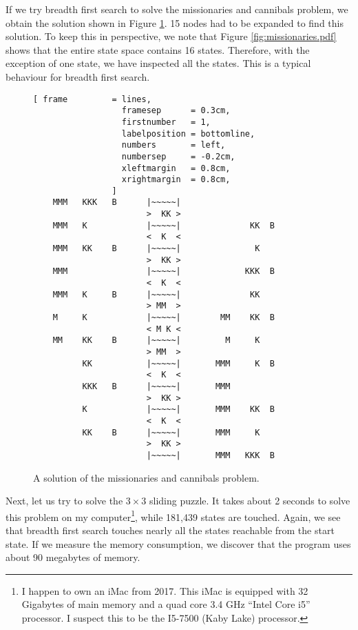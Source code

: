 If we try breadth first search to solve the missionaries and cannibals problem, we obtain
the solution shown in Figure \ref{fig:missionaries.solution}.  15 nodes had to be expanded to find
this solution.  To keep this in perspective, we note that Figure \ref{fig:missionaries.pdf} shows
that the entire state space contains 16 states.  Therefore, with the exception of one state, we have
inspected all the states.  This is a typical behaviour for breadth first search.

\begin{figure}[!ht]
\centering
\begin{Verbatim}[ frame         = lines,
                  framesep      = 0.3cm,
                  firstnumber   = 1,
                  labelposition = bottomline,
                  numbers       = left,
                  numbersep     = -0.2cm,
                  xleftmargin   = 0.8cm,
                  xrightmargin  = 0.8cm,
                ]
    MMM   KKK   B      |~~~~~|
                       >  KK >
    MMM   K            |~~~~~|              KK  B
                       <  K  <
    MMM   KK    B      |~~~~~|               K
                       >  KK >
    MMM                |~~~~~|             KKK  B
                       <  K  <
    MMM   K     B      |~~~~~|              KK
                       > MM  >
    M     K            |~~~~~|        MM    KK  B
                       < M K <
    MM    KK    B      |~~~~~|         M     K
                       > MM  >
          KK           |~~~~~|       MMM     K  B
                       <  K  <
          KKK   B      |~~~~~|       MMM
                       >  KK >
          K            |~~~~~|       MMM    KK  B
                       <  K  <
          KK    B      |~~~~~|       MMM     K
                       >  KK >
                       |~~~~~|       MMM   KKK  B
\end{Verbatim}
\vspace*{-0.3cm}
\caption{A solution of the missionaries and cannibals problem.}
\label{fig:missionaries.solution}
\end{figure}

Next, let us try to solve the $3 \times 3$ sliding puzzle.  It takes about 2 seconds to solve
this problem on my computer\footnote{
  I happen to own an iMac from 2017.  This iMac is equipped with 32 Gigabytes of main memory and a
  quad core 3.4 GHz ``Intel Core i5'' processor.  I suspect this to be the I5-7500 (Kaby Lake) processor.
}, while 181,439 states are touched.  
Again, we see that breadth first search touches nearly all the states reachable from the start state.
If we measure the memory consumption, we discover that the program uses about 90 megabytes of memory.

